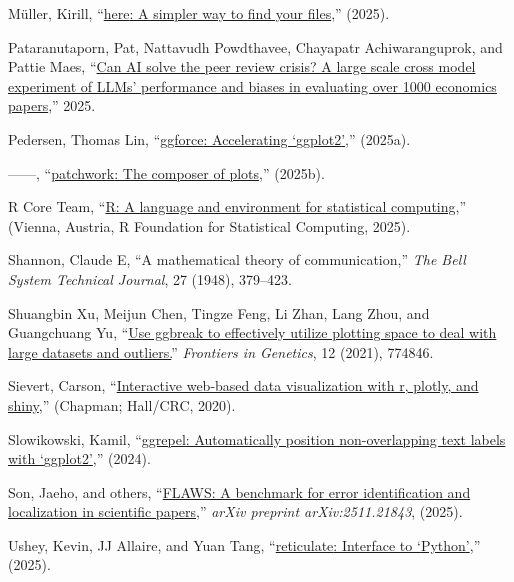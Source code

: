 \documentclass[
  11pt,
  letterpaper,
  DIV=11,
  numbers=noendperiod]{scrreprt}
\newlength{\cslhangindent}
\newenvironment{CSLReferences}[2] %
 {\begin{list}{}{%
  \setlength{\itemindent}{0pt}
  \setlength{\leftmargin}{0pt}
  \setlength{\parsep}{0pt}
  \ifodd #1
   \setlength{\leftmargin}{\cslhangindent}
   \setlength{\itemindent}{-1\cslhangindent}
  \fi
  \setlength{\itemsep}{#2\baselineskip}}}
 {\end{list}}
\begin{document}
\begin{CSLReferences}{1}{0}
Müller, Kirill, {``\href{https://here.r-lib.org/}{{here}: A simpler way
to find your files},''} (2025).

Pataranutaporn, Pat, Nattavudh Powdthavee, Chayapatr Achiwaranguprok,
and Pattie Maes,
{``\href{https://api.semanticscholar.org/CorpusID:277510314}{Can AI
solve the peer review crisis? A large scale cross model experiment of
LLMs' performance and biases in evaluating over 1000 economics
papers},''} 2025.

Pedersen, Thomas Lin,
{``\href{https://ggforce.data-imaginist.com}{{ggforce}: Accelerating
{`{ggplot2}'}},''} (2025a).

------, {``\href{https://patchwork.data-imaginist.com}{{patchwork}: The
composer of plots},''} (2025b).

R Core Team, {``\href{https://www.R-project.org/}{{R}: A language and
environment for statistical computing},''} (Vienna, Austria, R
Foundation for Statistical Computing, 2025).

Shannon, Claude E, {``A mathematical theory of communication,''}
\emph{The Bell System Technical Journal}, 27 (1948), 379--423.

Shuangbin Xu, Meijun Chen, Tingze Feng, Li Zhan, Lang Zhou, and
Guangchuang Yu, {``\href{https://doi.org/10.3389/fgene.2021.774846}{Use
ggbreak to effectively utilize plotting space to deal with large
datasets and outliers.}''} \emph{Frontiers in Genetics}, 12 (2021),
774846.

Sievert, Carson, {``\href{https://plotly-r.com}{Interactive web-based
data visualization with r, plotly, and shiny},''} (Chapman; Hall/CRC,
2020).

Slowikowski, Kamil, {``\href{https://ggrepel.slowkow.com/}{{ggrepel}:
Automatically position non-overlapping text labels with
{`{ggplot2}'}},''} (2024).

Son, Jaeho, and others,
{``\href{https://arxiv.org/abs/2511.21843}{FLAWS: A benchmark for error
identification and localization in scientific papers},''} \emph{arXiv
preprint arXiv:2511.21843}, (2025).

Ushey, Kevin, JJ Allaire, and Yuan Tang,
{``\href{https://rstudio.github.io/reticulate/}{{reticulate}: Interface
to {`{Python}'}},''} (2025).


\end{CSLReferences}
\end{document}
